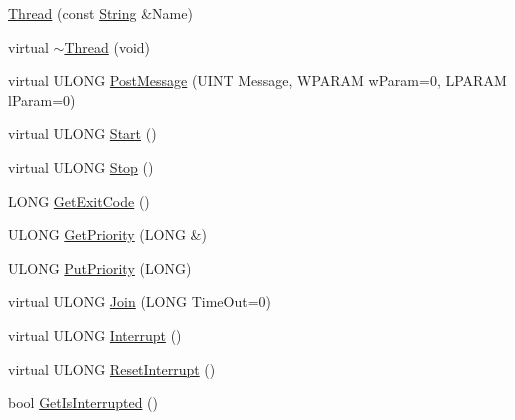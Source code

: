 \begin{DoxyCompactItemize}
\item 
\hyperlink{class_canberra_1_1_utility_1_1_core_1_1_thread_accf3a0d8c1bbcc5d2fb21bfacd0e0c5b_accf3a0d8c1bbcc5d2fb21bfacd0e0c5b}{Thread} (const \hyperlink{class_canberra_1_1_utility_1_1_core_1_1_string}{String} \&Name)
\item 
virtual \hyperlink{class_canberra_1_1_utility_1_1_core_1_1_thread_a0091317792eeb41b17f935d9c53ca92d_a0091317792eeb41b17f935d9c53ca92d}{$\sim$\+Thread} (void)
\item 
virtual U\+L\+O\+NG \hyperlink{class_canberra_1_1_utility_1_1_core_1_1_thread_a6f8e64dbea0a4ac8159a5dc33b9b106b_a6f8e64dbea0a4ac8159a5dc33b9b106b}{Post\+Message} (U\+I\+NT Message, W\+P\+A\+R\+AM w\+Param=0, L\+P\+A\+R\+AM l\+Param=0)
\item 
virtual U\+L\+O\+NG \hyperlink{class_canberra_1_1_utility_1_1_core_1_1_thread_a9a564084d8ca5b014ba5101dbf142d67_a9a564084d8ca5b014ba5101dbf142d67}{Start} ()
\item 
virtual U\+L\+O\+NG \hyperlink{class_canberra_1_1_utility_1_1_core_1_1_thread_aef351ecbb4a2fc31d8983bbbcb8ce83e_aef351ecbb4a2fc31d8983bbbcb8ce83e}{Stop} ()
\item 
L\+O\+NG \hyperlink{class_canberra_1_1_utility_1_1_core_1_1_thread_a2f42267504a9473a6800d4d36998194e_a2f42267504a9473a6800d4d36998194e}{Get\+Exit\+Code} ()
\item 
U\+L\+O\+NG \hyperlink{class_canberra_1_1_utility_1_1_core_1_1_thread_a5673b33f5b74126886399feafd0c1c1b_a5673b33f5b74126886399feafd0c1c1b}{Get\+Priority} (L\+O\+NG \&)
\item 
U\+L\+O\+NG \hyperlink{class_canberra_1_1_utility_1_1_core_1_1_thread_a6a7e0f40053cc71f5f99fe789b7ed089_a6a7e0f40053cc71f5f99fe789b7ed089}{Put\+Priority} (L\+O\+NG)
\item 
virtual U\+L\+O\+NG \hyperlink{class_canberra_1_1_utility_1_1_core_1_1_thread_a6ecc7af6e51f7fa5d45db0f05dd76435_a6ecc7af6e51f7fa5d45db0f05dd76435}{Join} (L\+O\+NG Time\+Out=0)
\item 
virtual U\+L\+O\+NG \hyperlink{class_canberra_1_1_utility_1_1_core_1_1_thread_a1fd94cc284af89a82282d506e5529d22_a1fd94cc284af89a82282d506e5529d22}{Interrupt} ()
\item 
virtual U\+L\+O\+NG \hyperlink{class_canberra_1_1_utility_1_1_core_1_1_thread_acb4ba595a15cc01aa86b846e1a4afd15_acb4ba595a15cc01aa86b846e1a4afd15}{Reset\+Interrupt} ()
\item 
bool \hyperlink{class_canberra_1_1_utility_1_1_core_1_1_thread_a3bdd38498aea2f23c5f04d1e13bc5672_a3bdd38498aea2f23c5f04d1e13bc5672}{Get\+Is\+Interrupted} ()
\end{DoxyCompactItemize}

